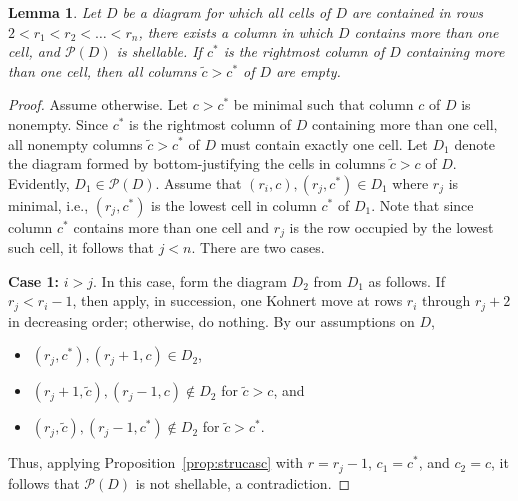 \documentclass[letterpaper,10pt]{article}
\newtheorem{lemma}[theorem]{Lemma}
\begin{document}
\begin{lemma}\label{lem:infrontblock}
    Let $D$ be a diagram for which all cells of $D$ are contained in rows $2<r_1<r_2<\hdots<r_n$, there exists a column in which $D$ contains more than one cell, and $\mathcal{P}(D)$ is shellable.
    If $c^*$ is the rightmost column of $D$ containing more than one cell, then all columns $\tilde{c}>c^*$ of $D$ are empty.
\end{lemma}
\begin{proof}
    Assume otherwise. Let $c>c^*$ be minimal such that column $c$ of $D$ is nonempty. Since $c^*$ is the rightmost column of $D$ containing more than one cell, all nonempty columns $\tilde{c}>c^*$ of $D$ must contain exactly one cell. Let $D_1$ denote the diagram formed by bottom-justifying the cells in columns $\tilde{c}>c$ of $D$. Evidently, $D_1\in \mathcal{P}(D)$. Assume that $(r_i,c),(r_j,c^*)\in D_1$ where $r_j$ is minimal, i.e., $(r_j,c^*)$ is the lowest cell in column $c^*$ of $D_1$. Note that since column $c^*$ contains more than one cell and $r_j$ is the row occupied by the lowest such cell, it follows that $j<n$. There are two cases.
    \bigskip

    \noindent
    \textbf{Case 1:} $i>j$. In this case, form the diagram $D_2$ from $D_1$ as follows. If $r_j<r_i-1$, then apply, in succession, one Kohnert move at rows $r_i$ through $r_j+2$ in decreasing order; otherwise, do nothing. By our assumptions on $D$,
    \begin{itemize}
        \item $(r_j,c^*),(r_j+1,c)\in D_2$,
        \item $(r_j+1,\tilde{c}),(r_j-1,c)\notin D_2$ for $\tilde{c}>c$, and
        \item $(r_j,\tilde{c}),(r_j-1,c^*)\notin D_2$ for $\tilde{c}>c^*$.
    \end{itemize}
    Thus, applying Proposition~\ref{prop:strucasc} with $r=r_j-1$, $c_1=c^*$, and $c_2=c$, it follows that $\mathcal{P}(D)$ is not shellable, a contradiction.
    \bigskip


\end{proof}
\end{document}
